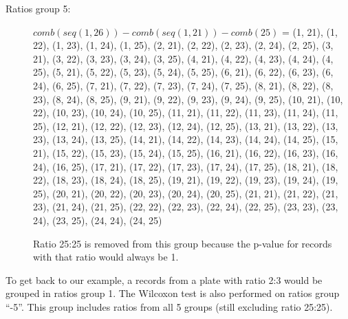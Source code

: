 \documentclass[letterpaper,10pt,english]{sphinxmanual}
\begin{document}
\begin{itemize}
\begin{description}
\item[{Ratios group 5:}] \leavevmode
$comb(seq(1,26)) - comb(seq(1,21)) - comb(25)$ =
(1, 21), (1, 22), (1, 23), (1, 24), (1, 25), (2, 21), (2, 22),
(2, 23), (2, 24), (2, 25), (3, 21), (3, 22), (3, 23), (3, 24),
(3, 25), (4, 21), (4, 22), (4, 23), (4, 24), (4, 25), (5, 21),
(5, 22), (5, 23), (5, 24), (5, 25), (6, 21), (6, 22), (6, 23),
(6, 24), (6, 25), (7, 21), (7, 22), (7, 23), (7, 24), (7, 25),
(8, 21), (8, 22), (8, 23), (8, 24), (8, 25), (9, 21), (9, 22),
(9, 23), (9, 24), (9, 25), (10, 21), (10, 22), (10, 23), (10, 24),
(10, 25), (11, 21), (11, 22), (11, 23), (11, 24), (11, 25),
(12, 21), (12, 22), (12, 23), (12, 24), (12, 25), (13, 21),
(13, 22), (13, 23), (13, 24), (13, 25), (14, 21), (14, 22),
(14, 23), (14, 24), (14, 25), (15, 21), (15, 22), (15, 23),
(15, 24), (15, 25), (16, 21), (16, 22), (16, 23), (16, 24),
(16, 25), (17, 21), (17, 22), (17, 23), (17, 24), (17, 25),
(18, 21), (18, 22), (18, 23), (18, 24), (18, 25), (19, 21),
(19, 22), (19, 23), (19, 24), (19, 25), (20, 21), (20, 22),
(20, 23), (20, 24), (20, 25), (21, 21), (21, 22), (21, 23),
(21, 24), (21, 25), (22, 22), (22, 23), (22, 24), (22, 25),
(23, 23), (23, 24), (23, 25), (24, 24), (24, 25)

Ratio 25:25 is removed from this group because the p-value for
records with that ratio would always be 1.

\end{description}

To get back to our example, a records from a plate with ratio 2:3
would be grouped in ratios group 1. The Wilcoxon test is also
performed on ratios group ``-5''. This group includes ratios from all
5 groups (still excluding ratio 25:25).

\end{itemize}
\end{document}
